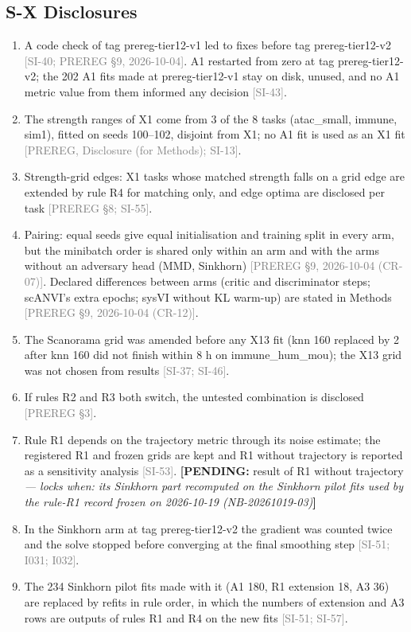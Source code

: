 \documentclass[11pt]{article}
\newcommand{\src}[1]{{\scriptsize\textcolor{gray}{[#1]}}}
\newcommand{\pending}[2]{{\color{BurntOrange}\textbf{[PENDING:} #1 \textit{--- locks when: #2}\textbf{]}}}
\begin{document}
\subsection*{S-X Disclosures}
\begin{enumerate}
\item A code check of tag prereg-tier12-v1 led to fixes before tag prereg-tier12-v2 \src{SI-40; PREREG \S9, 2026-10-04}. A1 restarted from zero at tag prereg-tier12-v2; the 202 A1 fits made at prereg-tier12-v1 stay on disk, unused, and no A1 metric value from them informed any decision \src{SI-43}.
\item The strength ranges of X1 come from 3 of the 8 tasks (atac\_small, immune, sim1), fitted on seeds 100--102, disjoint from X1; no A1 fit is used as an X1 fit \src{PREREG, Disclosure (for Methods); SI-13}.
\item Strength-grid edges: X1 tasks whose matched strength falls on a grid edge are extended by rule R4 for matching only, and edge optima are disclosed per task \src{PREREG \S8; SI-55}.
\item Pairing: equal seeds give equal initialisation and training split in every arm, but the minibatch order is shared only within an arm and with the arms without an adversary head (MMD, Sinkhorn) \src{PREREG \S9, 2026-10-04 (CR-07)}. Declared differences between arms (critic and discriminator steps; scANVI's extra epochs; sysVI without KL warm-up) are stated in Methods \src{PREREG \S9, 2026-10-04 (CR-12)}.
\item The Scanorama grid was amended before any X13 fit (knn 160 replaced by 2 after knn 160 did not finish within 8 h on immune\_hum\_mou); the X13 grid was not chosen from results \src{SI-37; SI-46}.
\item If rules R2 and R3 both switch, the untested combination is disclosed \src{PREREG \S3}.
\item Rule R1 depends on the trajectory metric through its noise estimate; the registered R1 and frozen grids are kept and R1 without trajectory is reported as a sensitivity analysis \src{SI-53}. \pending{result of R1 without trajectory}{its Sinkhorn part recomputed on the Sinkhorn pilot fits used by the rule-R1 record frozen on 2026-10-19 (NB-20261019-03)}
\item In the Sinkhorn arm at tag prereg-tier12-v2 the gradient was counted twice and the solve stopped before converging at the final smoothing step \src{SI-51; I031; I032}.
\item The 234 Sinkhorn pilot fits made with it (A1 180, R1 extension 18, A3 36) are replaced by refits in rule order, in which the numbers of extension and A3 rows are outputs of rules R1 and R4 on the new fits \src{SI-51; SI-57}.

\end{enumerate}
\end{document}
